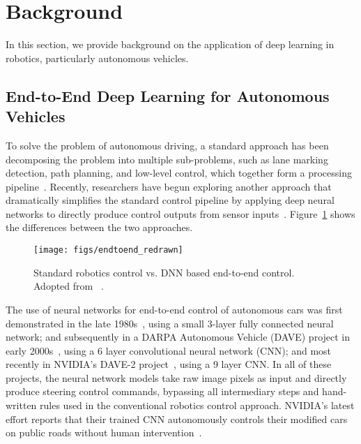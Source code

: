 \section{Background} \label{sec:background}

In this section, we provide background on the application of deep
learning in robotics, particularly autonomous vehicles. 


\subsection{End-to-End Deep Learning for Autonomous Vehicles}


To solve the problem of autonomous driving, a standard approach has
been decomposing the problem into multiple sub-problems,
such as lane marking detection, path planning, and low-level
control, which together form a processing pipeline~\cite{Bojarski2016}.
Recently, researchers have begun exploring another approach that dramatically
simplifies the standard control pipeline by applying deep neural
networks to directly produce control outputs from sensor
inputs~\cite{Levine2016}. Figure~\ref{fig:end-to-end-control}
shows the differences between the two approaches.

\begin{figure}[h]
  \centering
  \texttt{[image: figs/endtoend\_redrawn]}
  \caption{Standard robotics control vs. DNN based end-to-end
    control. Adopted from ~\cite{Levine2017cs294}.}
  \label{fig:end-to-end-control}
\end{figure}

The use of neural networks for end-to-end control of autonomous
cars was first demonstrated in the late 1980s~\cite{Pomerleau1989},
using a small 3-layer fully connected neural network; and subsequently
in a DARPA Autonomous Vehicle (DAVE) project in early
2000s~\cite{LeCun:04}, using a 6 layer convolutional neural network
(CNN); and most recently in NVIDIA's DAVE-2
project~\cite{Bojarski2016}, using a 9 layer CNN. In all of these projects,
the neural network models take raw image pixels as input and directly
produce steering control commands, bypassing all intermediary steps and
hand-written rules used in the conventional robotics control approach.  
NVIDIA's latest effort reports that their trained CNN
autonomously controls their modified cars on public roads without human
intervention~\cite{Bojarski2016}.

